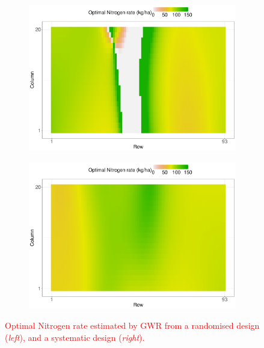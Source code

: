 \documentclass[a4paper]{article}   	%
\newcommand{\revision}[1]{\textcolor{red}{#1}}
\begin{document}
\begin{figure}[H]
	\begin{subfigure}[t]{0.45\textwidth}
		\centering
		\includegraphics[width=\linewidth]{Expt/optN_syst_AR1B9.pdf}
        \end{subfigure}
	\hspace{0.05\textwidth}
	\begin{subfigure}[t]{0.45\textwidth}
		\centering
		\includegraphics[width=\linewidth]{Expt/optN_rand_AR1B9.pdf}
        \end{subfigure}
	\caption{\revision{Optimal Nitrogen rate estimated by GWR from a randomised design (\textit{left}), and a systematic design (\textit{right}).}}\label{fig:optNmap}
\end{figure}

\end{document}

